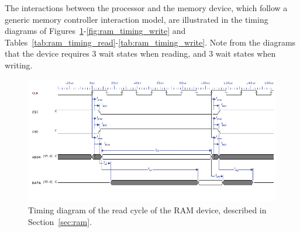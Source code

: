 \documentclass[titlepage]{scrartcl}
\begin{document}
	The interactions between the processor and the memory device, which follow a generic memory controller interaction model, are illustrated in the timing diagrams of Figures~\ref{fig:ram_timing_read}-\ref{fig:ram_timing_write} and Tables~\ref{tab:ram_timing_read}-\ref{tab:ram_timing_write}. Note from the diagrams that the device requires 3 wait states when reading, and 3 wait states when writing.\\

	\begin{figure}[h!]
	\vspace{-2cm}
	\centerline{\includegraphics[width=25cm, angle=90, origin=c]{img/ram_read.png}}
		\vspace{1cm}
                	\caption{Timing diagram of the read cycle of the RAM device, described in Section~\ref{sec:ram}.}
               	\label{fig:ram_timing_read}
	\end{figure}

	\clearpage
\end{document}
